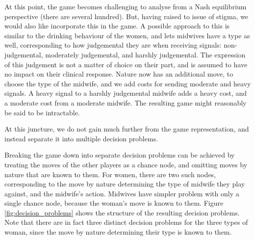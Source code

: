 At this point, the game becomes challenging to analyse from a Nash equilibrium perspective (there are several hundred). But, having raised to issue of stigma, we would also like incorporate this in the game. A possible approach to this is similar to the drinking behaviour of the women, and lets midwives have a type as well, corresponding to how judgemental they are when receiving signals: non-judgemental, moderately judgemental, and harshly judgemental. The expression of this judgement is not a matter of choice on their part, and is assumed to have no impact on their clinical response. Nature now has an additional move, to choose the type of the midwife, and we add costs for sending moderate and heavy signals. A heavy signal to a harshly judgemental midwife adds a heavy cost, and a moderate cost from a moderate midwife. The resulting game might reasonably be said to be intractable.

At this juncture, we do not gain much further from the game representation, and instead separate it into multiple decision problems. 

Breaking the game down into separate decision problems can be achieved by treating the moves of the other players as a chance node, and omitting moves by nature that are known to them. For women, there are two such nodes, corresponding to the move by nature determining the type of midwife they play against, and the midwife's action. Midwives have simpler problem with only a single chance node, because the woman's move is known to them. Figure \ref{fig:decision_problems} shows the structure of the resulting decision problems. Note that there are in fact three distinct decision problems for the three types of woman, since the move by nature determining their type is known to them. 

